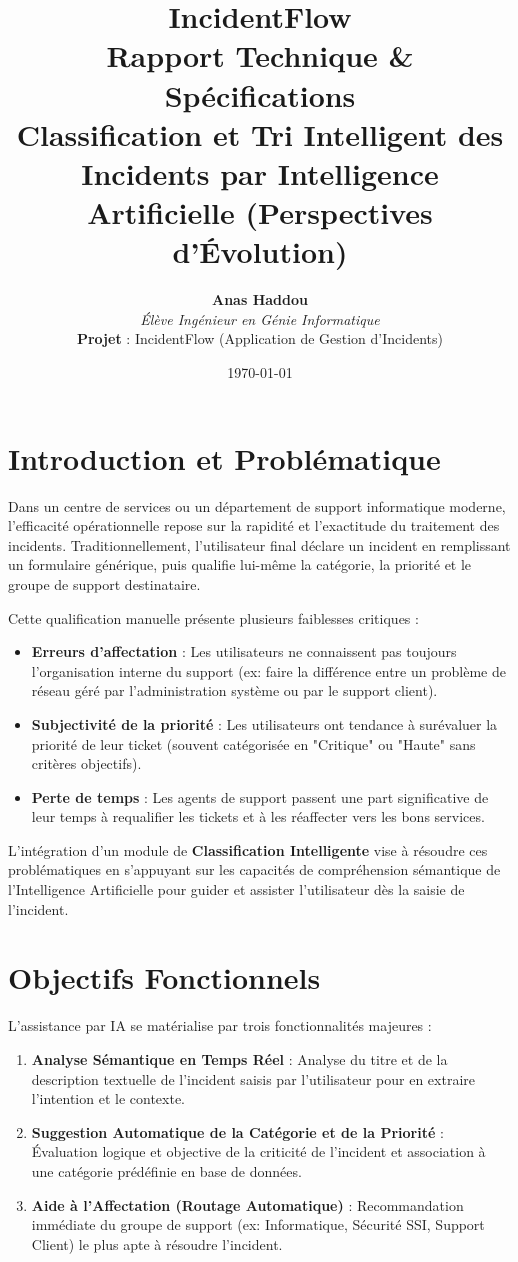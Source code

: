 \documentclass[12pt,a4paper]{article}
\title{
    \vspace{1cm}
    \textcolor{secondary}{\textbf{\Huge IncidentFlow}}\\[0.5cm]
    \textcolor{primary}{\Large Rapport Technique \& Spécifications}\\[1.5cm]
    \textbf{\Large Classification et Tri Intelligent des Incidents par Intelligence Artificielle (Perspectives d'Évolution)}\\[2cm]
}
\author{
    \textbf{Anas Haddou} \\
    \textit{Élève Ingénieur en Génie Informatique} \\[1cm]
    \textbf{Projet} : IncidentFlow (Application de Gestion d'Incidents)
}
\date{\today}
\begin{document}
\maketitle
\newpage
\tableofcontents
\newpage

\section{Introduction et Problématique}
Dans un centre de services ou un département de support informatique moderne, l'efficacité opérationnelle repose sur la rapidité et l'exactitude du traitement des incidents. Traditionnellement, l'utilisateur final déclare un incident en remplissant un formulaire générique, puis qualifie lui-même la catégorie, la priorité et le groupe de support destinataire. 

Cette qualification manuelle présente plusieurs faiblesses critiques :
\begin{itemize}
    \item \textbf{Erreurs d'affectation} : Les utilisateurs ne connaissent pas toujours l'organisation interne du support (ex: faire la différence entre un problème de réseau géré par l'administration système ou par le support client).
    \item \textbf{Subjectivité de la priorité} : Les utilisateurs ont tendance à surévaluer la priorité de leur ticket (souvent catégorisée en "Critique" ou "Haute" sans critères objectifs).
    \item \textbf{Perte de temps} : Les agents de support passent une part significative de leur temps à requalifier les tickets et à les réaffecter vers les bons services.
\end{itemize}

L'intégration d'un module de \textbf{Classification Intelligente} vise à résoudre ces problématiques en s'appuyant sur les capacités de compréhension sémantique de l'Intelligence Artificielle pour guider et assister l'utilisateur dès la saisie de l'incident.

\section{Objectifs Fonctionnels}
L'assistance par IA se matérialise par trois fonctionnalités majeures :
\begin{enumerate}
    \item \textbf{Analyse Sémantique en Temps Réel} : Analyse du titre et de la description textuelle de l'incident saisis par l'utilisateur pour en extraire l'intention et le contexte.
    \item \textbf{Suggestion Automatique de la Catégorie et de la Priorité} : Évaluation logique et objective de la criticité de l'incident et association à une catégorie prédéfinie en base de données.
    \item \textbf{Aide à l'Affectation (Routage Automatique)} : Recommandation immédiate du groupe de support (ex: Informatique, Sécurité SSI, Support Client) le plus apte à résoudre l'incident.
\end{enumerate}
\end{document}
